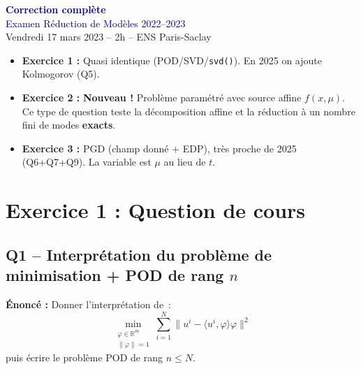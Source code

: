\documentclass[11pt,a4paper]{article}
\begin{document}
\begin{center}
{\Huge\bfseries\textcolor{darkblue}{Correction compl\`ete}}\\[0.3cm]
{\LARGE\textcolor{darkblue}{Examen R\'eduction de Mod\`eles 2022--2023}}\\[0.3cm]
{\large Vendredi 17 mars 2023 -- 2h -- ENS Paris-Saclay}
\end{center}

\begin{diffbox}
\begin{itemize}[nosep]
\item \textbf{Exercice 1 :} Quasi identique (POD/SVD/\texttt{svd()}). En 2025 on ajoute Kolmogorov (Q5).
\item \textbf{Exercice 2 :} \textbf{Nouveau !} Probl\`eme param\'etr\'e avec source affine $f(x,\mu)$. Ce type de question teste la d\'ecomposition affine et la r\'eduction \`a un nombre fini de modes \textbf{exacts}.
\item \textbf{Exercice 3 :} PGD (champ donn\'e + EDP), tr\`es proche de 2025 (Q6+Q7+Q9). La variable est $\mu$ au lieu de $t$.
\end{itemize}
\end{diffbox}

\vspace{0.5cm}

\section{Exercice 1 : Question de cours}

\subsection{Q1 -- Interpr\'etation du probl\`eme de minimisation + POD de rang $n$}

\textbf{\'Enonc\'e :} Donner l'interpr\'etation de~:
\[
\min_{\substack{\varphi \in \mathbb{R}^m \\ \|\varphi\|=1}} \sum_{i=1}^{N} \|u^i - \langle u^i,\varphi\rangle\varphi\|^2
\]
puis \'ecrire le probl\`eme POD de rang $n \leq N$.
\end{document}
